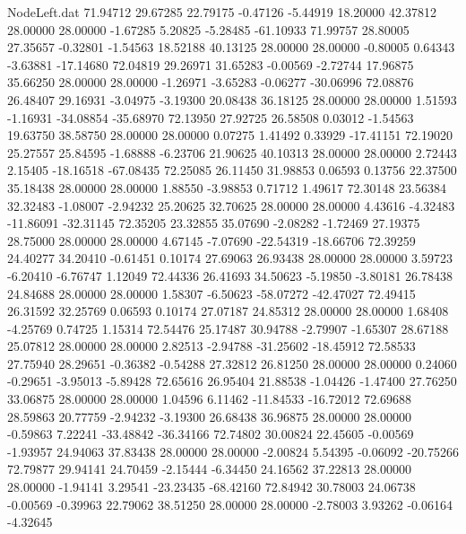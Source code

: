 \begin{filecontents}{NodeLeft.dat}
  71.94712   29.67285   22.79175    -0.47126   -5.44919   18.20000   42.37812   28.00000   28.00000   -1.67285    5.20825   -5.28485  -61.10933
  71.99757   28.80005   27.35657    -0.32801   -1.54563   18.52188   40.13125   28.00000   28.00000   -0.80005    0.64343   -3.63881  -17.14680
  72.04819   29.26971   31.65283    -0.00569   -2.72744   17.96875   35.66250   28.00000   28.00000   -1.26971   -3.65283   -0.06277  -30.06996
  72.08876   26.48407   29.16931    -3.04975   -3.19300   20.08438   36.18125   28.00000   28.00000    1.51593   -1.16931  -34.08854  -35.68970
  72.13950   27.92725   26.58508     0.03012   -1.54563   19.63750   38.58750   28.00000   28.00000    0.07275    1.41492    0.33929  -17.41151
  72.19020   25.27557   25.84595    -1.68888   -6.23706   21.90625   40.10313   28.00000   28.00000    2.72443    2.15405  -18.16518  -67.08435
  72.25085   26.11450   31.98853     0.06593    0.13756   22.37500   35.18438   28.00000   28.00000    1.88550   -3.98853    0.71712    1.49617
  72.30148   23.56384   32.32483    -1.08007   -2.94232   25.20625   32.70625   28.00000   28.00000    4.43616   -4.32483  -11.86091  -32.31145
  72.35205   23.32855   35.07690    -2.08282   -1.72469   27.19375   28.75000   28.00000   28.00000    4.67145   -7.07690  -22.54319  -18.66706
  72.39259   24.40277   34.20410    -0.61451    0.10174   27.69063   26.93438   28.00000   28.00000    3.59723   -6.20410   -6.76747    1.12049
  72.44336   26.41693   34.50623    -5.19850   -3.80181   26.78438   24.84688   28.00000   28.00000    1.58307   -6.50623  -58.07272  -42.47027
  72.49415   26.31592   32.25769     0.06593    0.10174   27.07187   24.85312   28.00000   28.00000    1.68408   -4.25769    0.74725    1.15314
  72.54476   25.17487   30.94788    -2.79907   -1.65307   28.67188   25.07812   28.00000   28.00000    2.82513   -2.94788  -31.25602  -18.45912
  72.58533   27.75940   28.29651    -0.36382   -0.54288   27.32812   26.81250   28.00000   28.00000    0.24060   -0.29651   -3.95013   -5.89428
  72.65616   26.95404   21.88538    -1.04426   -1.47400   27.76250   33.06875   28.00000   28.00000    1.04596    6.11462  -11.84533  -16.72012
  72.69688   28.59863   20.77759    -2.94232   -3.19300   26.68438   36.96875   28.00000   28.00000   -0.59863    7.22241  -33.48842  -36.34166
  72.74802   30.00824   22.45605    -0.00569   -1.93957   24.94063   37.83438   28.00000   28.00000   -2.00824    5.54395   -0.06092  -20.75266
  72.79877   29.94141   24.70459    -2.15444   -6.34450   24.16562   37.22813   28.00000   28.00000   -1.94141    3.29541  -23.23435  -68.42160
  72.84942   30.78003   24.06738    -0.00569   -0.39963   22.79062   38.51250   28.00000   28.00000   -2.78003    3.93262   -0.06164   -4.32645

\end{filecontents}
